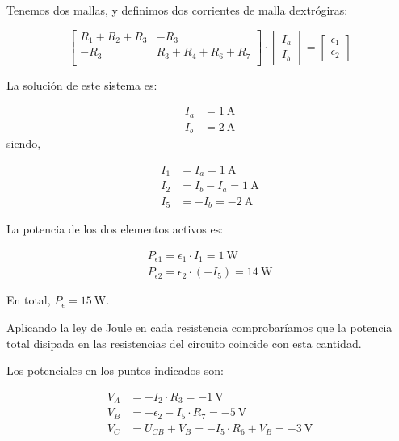 Tenemos dos mallas, y definimos dos corrientes de malla dextrógiras:

\begin{equation*}
  \begin{bmatrix}
    R_1 + R_2 + R_3 & -R_3\\
    -R_3 & R_3 + R_4 + R_6 + R_7\\
  \end{bmatrix} \cdot %
  \begin{bmatrix}
    I_a\\
    I_b
  \end{bmatrix} = %
  \begin{bmatrix}
    \epsilon_1\\
    \epsilon_2
  \end{bmatrix}
\end{equation*}

La solución de este sistema es:

\begin{align*}
  I_a &= \qty{1}{\ampere}\\
  I_b &= \qty{2}{\ampere}
\end{align*}
siendo,

\begin{align*}
  I_1 &= I_a = \qty{1}{\ampere}\\
  I_2 &= I_b - I_a = \qty{1}{\ampere}\\
  I_5 &= -I_b = \qty{-2}{\ampere}
\end{align*}

La potencia de los dos elementos activos es:

\begin{align*}
  P_{\epsilon1} = \epsilon_1 \cdot I_1 = \qty{1}{\watt}\\
  P_{\epsilon2} = \epsilon_2 \cdot (-I_5) = \qty{14}{\watt}
\end{align*}

En total, $P_\epsilon = \qty{15}{\watt}$.

Aplicando la ley de Joule en cada resistencia comprobaríamos que la potencia total disipada en las resistencias del circuito coincide con esta cantidad.

Los potenciales en los puntos indicados son:

\begin{align*}
  V_A &= -I_2 \cdot R_3 = \qty{-1}{\volt}\\
  V_B &= -\epsilon_2 - I_5 \cdot R_7 = \qty{-5}{\volt}\\
  V_C &= U_{CB} + V_B = -I_5 \cdot R_6 + V_B = \qty{-3}{\volt}
\end{align*}

